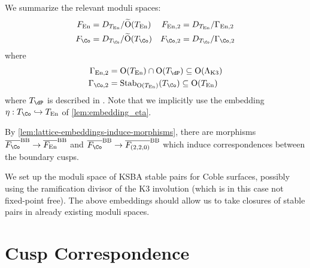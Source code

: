 \documentclass{amsart}
\renewcommand{\tilde}{\widetilde}
\begin{document}
\begin{remark}

We summarize the relevant moduli spaces: \begin{align*} F_{\operatorname{En}} &= D_{T_{\operatorname{En}}}/\tilde {\operatorname{O}}(T_{\operatorname{En}}) &  F_{\operatorname{En}, 2} &= D_{T_{\operatorname{En}}}/\Gamma_{\operatorname{En}, 2} \\ F_\Co &= D_{T_{\Co}} / \tilde {\operatorname{O}}(T_{\Co}) &  F_{\Co, 2} &= D_{T_{\Co}}/\Gamma_{\Co, 2}  \end{align*} where \begin{align*} \Gamma_{\operatorname{En}, 2} &= {\operatorname{O}}(T_{\operatorname{En}}) \cap{\operatorname{O}}(T_\dP) \subseteq {\operatorname{O}}(\Lambda_{\mathrm{K3}}) \\ \Gamma_{\Co, 2} &= \mathrm{Stab}_{{\operatorname{O}}(T_{\operatorname{En}})}(T_{\Co}) \subseteq {\operatorname{O}}(T_{\operatorname{En}}) \end{align*} where \(T_{\dP}\) is described in \cite{AEGS23}. Note that we implicitly use the embedding \(\eta: T_{\Co} \hookrightarrow T_{\operatorname{En}}\) of \cref{lem:embedding_eta}.

\end{remark}

\begin{remark}

By \cref{lem:lattice-embeddings-induce-morphisms}, there are morphisms \(\overline{F_{\Co}}^{\operatorname{BB}} \to \overline{F_{\operatorname{En}}}^{\operatorname{BB}}\) and \(\overline{F_{\Co}}^{\operatorname{BB}} \to \overline{F_{(2,2,0)}}^{\operatorname{BB}}\) which induce correspondences between the boundary cusps.

\end{remark}

\begin{remark}

We set up the moduli space of KSBA stable pairs for Coble surfaces, possibly using the ramification divisor of the K3 involution (which is in this case not fixed-point free). The above embeddings should allow us to take closures of stable pairs in already existing moduli spaces.

\end{remark}

\section{Cusp Correspondence}\label{cusp-correspondence}
\end{document}
